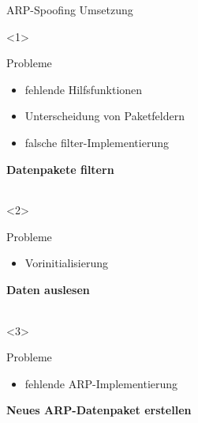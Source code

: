 \begin{frame}[fragile, t]{ARP-Spoofing Umsetzung}
	\begin{onlyenv}
		\begin{block}{Probleme}
			\begin{itemize}
				\item fehlende Hilfsfunktionen
				\item Unterscheidung von Paketfeldern
				\item falsche filter-Implementierung
			\end{itemize}
		\end{block}
		
		\textbf{Datenpakete filtern} \\
		\begin{tabular}{c}
			
		\end{tabular}
	\end{onlyenv}

	\begin{onlyenv}
		\begin{block}{Probleme}
			\begin{itemize}
				\item Vorinitialisierung
			\end{itemize}
		\end{block}
	
		\textbf{Daten auslesen} \\
		\begin{tabular}{c}
			
		\end{tabular}
	\end{onlyenv}


	\begin{onlyenv}
		\begin{block}{Probleme}
			\begin{itemize}
				\item fehlende ARP-Implementierung
			\end{itemize}
		\end{block}
		
		\textbf{Neues ARP-Datenpaket erstellen} \\
		\begin{tabular}{c}
			
		\end{tabular}
	\end{onlyenv}


\end{frame}
